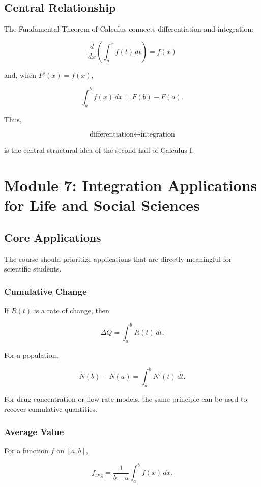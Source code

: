 \documentclass[11pt]{article}
\begin{document}
\subsection{Central Relationship}

The Fundamental Theorem of Calculus connects differentiation and integration:

\[
\boxed{
\frac{d}{dx}
\left(
\int_a^x f(t)\,dt
\right)
=
f(x)
}
\]

and, when $F'(x)=f(x)$,

\[
\boxed{
\int_a^b f(x)\,dx
=
F(b)-F(a).
}
\]

Thus,

\[
\boxed{
\text{differentiation}
\longleftrightarrow
\text{integration}
}
\]

is the central structural idea of the second half of Calculus I.

\section{Module 7: Integration Applications for Life and Social Sciences}

\subsection{Core Applications}

The course should prioritize applications that are directly meaningful for
scientific students.

\subsubsection{Cumulative Change}

If $R(t)$ is a rate of change, then

\[
\Delta Q
=
\int_a^b R(t)\,dt.
\]

For a population,

\[
N(b)-N(a)
=
\int_a^b N'(t)\,dt.
\]

For drug concentration or flow-rate models, the same principle can be used
to recover cumulative quantities.

\subsubsection{Average Value}

For a function $f$ on $[a,b]$,

\[
f_{\mathrm{avg}}
=
\frac{1}{b-a}
\int_a^b f(x)\,dx.
\]
\end{document}
